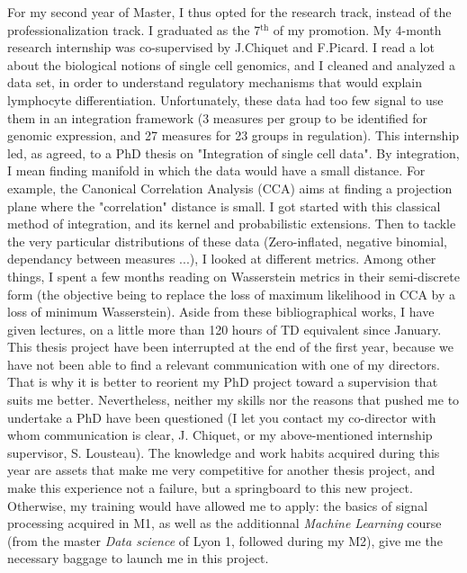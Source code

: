 \documentclass[a4paper,12pt, english]{article}
\begin{document}
For my second year of Master, I thus opted for the research track, instead of the professionalization track. I graduated as the 7$^{\text{th}}$ of my promotion. 
My 4-month research internship was co-supervised by J.Chiquet and F.Picard. I read a lot about the biological notions of single cell genomics, and I cleaned and analyzed a data set, in order to understand regulatory mechanisms that would explain lymphocyte differentiation. Unfortunately, these data had too few signal to use them in an integration framework (3 measures per group to be identified for genomic expression, and 27 measures for 23 groups in regulation). This internship led, as agreed, to a PhD thesis on "Integration of single cell data". 
By integration, I mean finding manifold in which the data would have a small distance. For example, the Canonical Correlation Analysis (CCA) aims at finding a projection plane where the "correlation" distance is small. I got started with this classical method of integration, and its kernel and probabilistic extensions. Then to tackle the very particular distributions of these data (Zero-inflated, negative binomial, dependancy between measures ...), I looked at different metrics. Among other things, I spent a few months reading on Wasserstein metrics in their semi-discrete form (the objective being to replace the loss of maximum likelihood in CCA by a loss of minimum Wasserstein). %
Aside from these bibliographical works, I have given lectures, on a little more than 120 hours of TD equivalent since January. 
This thesis project have been interrupted at the end of the first year, %
because we have not been able to find a relevant communication with one of my directors. That is why it is better to reorient my PhD project toward a supervision that suits me better. 
Nevertheless, neither my skills nor the reasons that pushed me to undertake a PhD have been questioned (I let you contact my co-director with whom communication is clear, J. Chiquet, or my above-mentioned internship supervisor, S. Lousteau). 
The knowledge and work habits acquired during this year are assets that make me very competitive for another thesis project, and make this experience not a failure, but a springboard to this new project. 
%
Otherwise, my training would have allowed me to apply: the basics of signal processing acquired in M1, as well as the additionnal \textit{Machine Learning} course (from the master \textit{Data science} of Lyon 1, followed during my M2), give me the necessary baggage to launch me in this project. 
\end{document}
